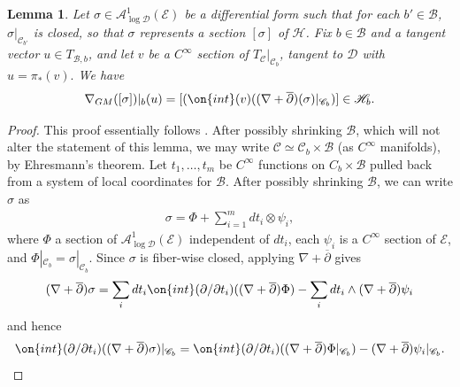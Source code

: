 \documentclass[12 pt]{amsart}
\theoremstyle{plain}
\newtheorem{lemma}[subsubsection]{Lemma}
\theoremstyle{definition}
\theoremstyle{remark}
\numberwithin{equation}{section}
\begin{document}
\begin{lemma}
	\label{lemma:connection-to-interior}
	Let $\sigma\in \mathcal A^1_{\log \mathscr{D}}(\mathscr{E})$ be a
	differential form such that for each $b'\in \mathscr{B}$,
	$\sigma|_{\mathscr{C}_{b'}}$ is closed, so that $\sigma$ represents a
	section $[\sigma]$ of $\mathscr{H}$.
Fix $b\in \mathscr{B}$ and a tangent vector $u\in T_{\mathscr{B}, b}$, and let
$v$ be a $C^\infty$ section of $T_\mathscr{C}|_{\mathscr{C}_b}$, tangent to
$\mathscr{D}$ with $u = \pi_*(v).$
	We have
	\begin{align*}
		\nabla_{GM}([\sigma])|_b(u)= [(\on{int}(v)((\nabla+\overline{\partial})
	(\sigma)|_{\mathscr C_b})]\in \mathscr{H}_b.
	\end{align*}
\end{lemma}
\begin{proof}
	This proof essentially follows \cite[Proposition
	9.14]{Voisin:hodgeTheory}.	
	After possibly shrinking $\mathscr B$, which will not alter the statement of this
	lemma, we may write $\mathscr C \simeq
	\mathscr C_b \times \mathscr B$ (as $C^\infty$ manifolds), by Ehresmann's theorem. 
	Let $t_1, \ldots, t_m$ be $C^\infty$  functions on $C_b \times
	\mathscr B$ pulled back from a system of local coordinates for $\mathscr B$.
	After possibly shrinking $\mathscr B$, we can write
	$\sigma$ as
	\begin{align*}
		\sigma = \Phi + \sum_{i=1}^m dt_i \otimes \psi_i, 
	\end{align*}
	where $\Phi$ a section of $\mathscr{A}^1_{\log \mathscr{D}}(\mathscr{E})$ independent of
	$dt_i$, 
	each
	$\psi_i$ is a $C^\infty$ section of $\mathscr{E}$,
	and $\Phi|_{\mathscr C_b} = \sigma|_{\mathscr C_b}$. 
	Since $\sigma$ is fiber-wise closed, applying $\nabla+\overline{\partial}$ gives
		\begin{align*}
		(\nabla+\overline{\partial}) \sigma = \sum_i dt_i
		\on{int}(\partial/\partial t_i)((\nabla+\overline{\partial})\Phi) - \sum_i dt_i \wedge (\nabla+\overline{\partial})
		\psi_i 
	\end{align*}
	and hence
	\begin{align*}
		\on{int}(\partial/\partial t_i) ((\nabla+\overline{\partial})\sigma)|_{\mathscr{C}_b} =
	\on{int}(\partial/\partial t_i)((\nabla+\overline{\partial})\Phi|_{\mathscr{C}_b}) - (\nabla+\overline{\partial})
		\psi_i|_{\mathscr{C}_b}. 
	\end{align*}
	

\end{proof}
\end{document}
